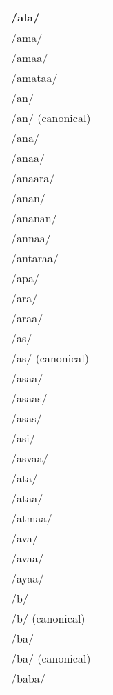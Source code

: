 \documentclass{article}
\begin{document}
\begin{longtable}{|l|p{}|}
/ala/ & \textIndus{} \\ \hline
/ama/ & \textIndus{} \\ \hline
/amaa/ & \textIndus{} \\ \hline
/amataa/ & \textIndus{} \\ \hline
/an/ & \textIndus{} \\ \hline
/an/ (canonical) & \textIndus{} \\ \hline
/ana/ & \textIndus{} \\ \hline
/anaa/ & \textIndus{} \\ \hline
/anaara/ & \textIndus{} \\ \hline
/anan/ & \textIndus{} \\ \hline
/ananan/ & \textIndus{} \\ \hline
/annaa/ & \textIndus{} \\ \hline
/antaraa/ & \textIndus{} \\ \hline
/apa/ & \textIndus{} \\ \hline
/ara/ & \textIndus{} \\ \hline
/araa/ & \textIndus{} \\ \hline
/as/ & \textIndus{} \\ \hline
/as/ (canonical) & \textIndus{} \\ \hline
/asaa/ & \textIndus{} \\ \hline
/asaas/ & \textIndus{} \\ \hline
/asas/ & \textIndus{} \\ \hline
/asi/ & \textIndus{} \\ \hline
/asvaa/ & \textIndus{} \\ \hline
/ata/ & \textIndus{} \\ \hline
/ataa/ & \textIndus{} \\ \hline
/atmaa/ & \textIndus{} \\ \hline
/ava/ & \textIndus{} \\ \hline
/avaa/ & \textIndus{} \\ \hline
/ayaa/ & \textIndus{} \\ \hline
/b/ & \textIndus{} \\ \hline
/b/ (canonical) & \textIndus{} \\ \hline
/ba/ & \textIndus{} \\ \hline
/ba/ (canonical) & \textIndus{} \\ \hline
/baba/ & \textIndus{} \\ \hline

\end{longtable}
\end{document}
